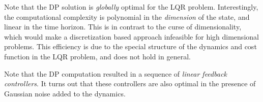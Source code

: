 
Note that the DP solution is \emph{globally} optimal for the LQR problem. Interestingly, the computational complexity is polynomial in the \textit{dimension} of the state, and linear in the time horizon. This is in contrast to the curse of dimensionality, which would make a discretization based approach infeasible for high dimensional problems. This efficiency is due to the special structure of the dynamics and cost function in the LQR problem, and does not hold in general.

\begin{remark}
    Note that the DP computation resulted in a sequence of \textit{linear feedback controllers}. It turns out that these controllers are also optimal in the presence of Gaussian noise added to the dynamics.
\end{remark}


